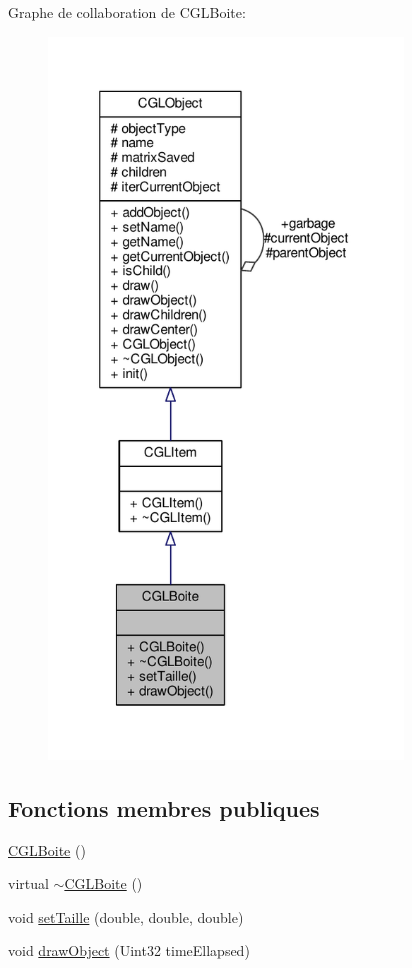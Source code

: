 Graphe de collaboration de C\-G\-L\-Boite\-:\nopagebreak
\begin{figure}[H]
\begin{center}
\leavevmode
\includegraphics[width=267pt]{db/da1/class_c_g_l_boite__coll__graph}
\end{center}
\end{figure}
\subsection*{Fonctions membres publiques}
\begin{DoxyCompactItemize}
\item 
\hyperlink{class_c_g_l_boite_a9e7f9611e7a265f45bfc93d0c2546a12}{C\-G\-L\-Boite} ()
\item 
virtual \hyperlink{class_c_g_l_boite_a29ac55b7ecc365928a6506a92e709d24}{$\sim$\-C\-G\-L\-Boite} ()
\item 
void \hyperlink{class_c_g_l_boite_aadb5f6701470652fc1232bb36a3fedd8}{set\-Taille} (double, double, double)
\item 
void \hyperlink{class_c_g_l_boite_adc20f63de77be2f8a93500f0065b5e27}{draw\-Object} (Uint32 time\-Ellapsed)
\end{DoxyCompactItemize}
